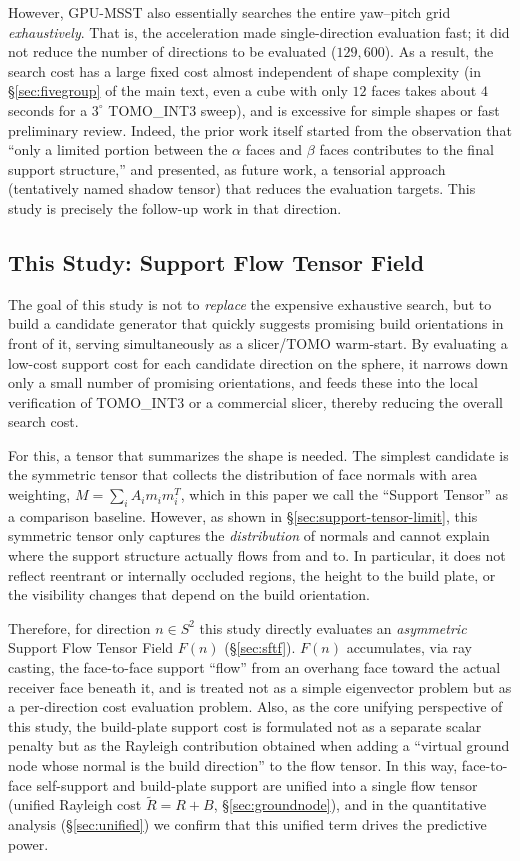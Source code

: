 \documentclass[11pt,a4paper]{article}
\begin{document}
However, GPU-MSST also essentially searches the entire yaw--pitch grid \emph{exhaustively}.
That is, the acceleration made single-direction evaluation fast; it did not reduce the number of directions to be evaluated ($129{,}600$).
As a result, the search cost has a large fixed cost almost independent of shape complexity
(in \S\ref{sec:fivegroup} of the main text, even a cube with only $12$ faces takes about $4$ seconds for a $3^\circ$ TOMO\_INT3 sweep),
and is excessive for simple shapes or fast preliminary review.
Indeed, the prior work itself started from the observation that ``only a limited portion between the $\alpha$ faces and $\beta$ faces contributes to the final support structure,''
and presented, as future work, a tensorial approach (tentatively named shadow tensor) that reduces the evaluation targets.
This study is precisely the follow-up work in that direction.

\subsection{This Study: Support Flow Tensor Field}

The goal of this study is not to \emph{replace} the expensive exhaustive search, but to build a candidate generator
that quickly suggests promising build orientations in front of it, serving simultaneously as a slicer/TOMO warm-start.
By evaluating a low-cost support cost for each candidate direction on the sphere, it narrows down only a small number of promising orientations,
and feeds these into the local verification of TOMO\_INT3 or a commercial slicer, thereby reducing the overall search cost.

For this, a tensor that summarizes the shape is needed.
The simplest candidate is the symmetric tensor that collects the distribution of face normals with area weighting,
$M=\sum_i A_i m_i m_i^T$, which in this paper we call the ``Support Tensor'' as a comparison baseline.
However, as shown in \S\ref{sec:support-tensor-limit}, this symmetric tensor only captures the \emph{distribution} of normals
and cannot explain where the support structure actually flows from and to.
In particular, it does not reflect reentrant or internally occluded regions, the height to the build plate,
or the visibility changes that depend on the build orientation.

Therefore, for direction $n\in S^2$ this study directly evaluates an \emph{asymmetric} Support Flow Tensor Field $F(n)$
(\S\ref{sec:sftf}).
$F(n)$ accumulates, via ray casting, the face-to-face support ``flow'' from an overhang face toward the actual receiver face beneath it,
and is treated not as a simple eigenvector problem but as a per-direction cost evaluation problem.
Also, as the core unifying perspective of this study, the build-plate support cost is formulated not as a separate scalar penalty but as
the Rayleigh contribution obtained when adding a ``virtual ground node whose normal is the build direction'' to the flow tensor.
In this way, face-to-face self-support and build-plate support are unified into a single flow tensor
(unified Rayleigh cost $\tilde R=R+B$, \S\ref{sec:groundnode}),
and in the quantitative analysis (\S\ref{sec:unified}) we confirm that this unified term drives the predictive power.
\end{document}
